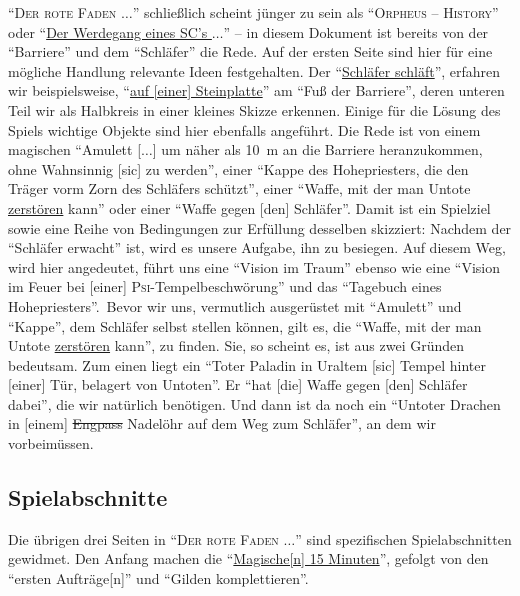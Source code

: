 \documentclass[a5paper,pagesize,numbers=noenddot]{scrbook}
\begin{document}
\enquote{\textsc{Der rote Faden $\ldots$}} schließlich scheint jünger zu sein als \enquote{\textsc{Orpheus -- History}} oder \enquote{\uline{Der Werdegang eines SC's $\ldots$}} -- in diesem Dokument ist bereits von der \enquote{Barriere} und dem \enquote{Schläfer} die Rede.
Auf der ersten Seite sind hier für eine mögliche Handlung relevante Ideen festgehalten.
Der \enquote{\uline{Schläfer schläft}}, erfahren wir beispielsweise, \enquote{\uline{auf [einer] Steinplatte}} am \enquote{Fuß der Barriere}, deren unteren Teil wir als Halbkreis in einer kleines Skizze erkennen.
Einige für die Lösung des Spiels wichtige Objekte sind hier ebenfalls angeführt.
Die Rede ist von einem magischen \enquote{Amulett [$\ldots$] um näher als 10~m an die Barriere heranzukommen, ohne Wahnsinnig [sic] zu werden}, einer \enquote{Kappe des Hohepriesters, die den Träger vorm Zorn des Schläfers schützt}, einer \enquote{Waffe, mit der man Untote \uline{zerstören} kann} oder einer \enquote{Waffe gegen [den] Schläfer}.
Damit ist ein Spielziel sowie eine Reihe von Bedingungen zur Erfüllung desselben skizziert:
Nachdem der \enquote{Schläfer erwacht} ist, wird es unsere Aufgabe, ihn zu besiegen.
Auf diesem Weg, wird hier angedeutet, führt uns eine \enquote{Vision im Traum} ebenso wie eine \enquote{Vision im Feuer bei [einer] \textsc{Psi}-Tempelbeschwörung} und das \enquote{Tagebuch eines Hohepriesters}.\
Bevor wir uns, vermutlich ausgerüstet mit \enquote{Amulett} und \enquote{Kappe}, dem Schläfer selbst stellen können, gilt es, die \enquote{Waffe, mit der man Untote \uline{zerstören} kann}, zu finden.
Sie, so scheint es, ist aus zwei Gründen bedeutsam.
Zum einen liegt ein \enquote{Toter Paladin in Uraltem [sic] Tempel hinter [einer] Tür, belagert von Untoten}.
Er \enquote{hat [die] Waffe gegen [den] Schläfer dabei}, die wir natürlich benötigen.
Und dann ist da noch ein \enquote{Untoter Drachen in [einem] \sout{Engpass} Nadelöhr auf dem Weg zum Schläfer}, an dem wir vorbeimüssen.


\subsection{Spielabschnitte}\label{sec:orpheus_geschichte_abschnitte}
Die übrigen drei Seiten in \enquote{\textsc{Der rote Faden $\ldots$}} sind spezifischen Spielabschnitten gewidmet.
Den Anfang machen die \enquote{\uline{Magische[n] 15 Minuten}}, gefolgt von den \enquote{ersten Aufträge[n]} und \enquote{Gilden komplettieren}.
\end{document}
